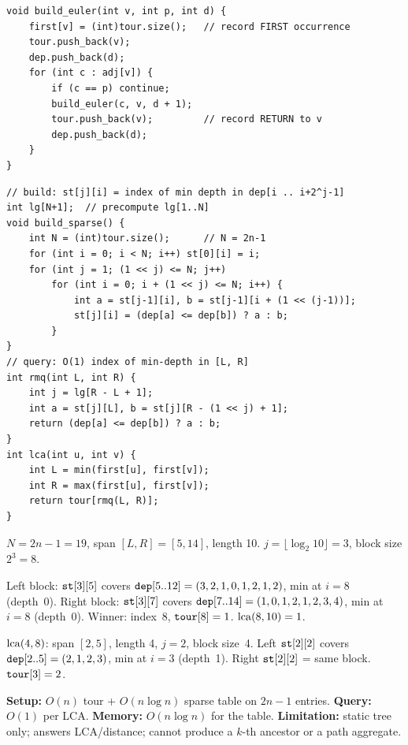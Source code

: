 \begin{lstlisting}[caption={Build tour, first[] and dep[] on a rooted tree (children ascending)}, label={lst:c11-euler}]
void build_euler(int v, int p, int d) {
    first[v] = (int)tour.size();   // record FIRST occurrence
    tour.push_back(v);
    dep.push_back(d);
    for (int c : adj[v]) {
        if (c == p) continue;
        build_euler(c, v, d + 1);
        tour.push_back(v);         // record RETURN to v
        dep.push_back(d);
    }
}
\end{lstlisting}

\begin{lstlisting}[caption={Build and query a sparse table on the tour depth array}, label={lst:c11-sparse}]
// build: st[j][i] = index of min depth in dep[i .. i+2^j-1]
int lg[N+1];  // precompute lg[1..N]
void build_sparse() {
    int N = (int)tour.size();      // N = 2n-1
    for (int i = 0; i < N; i++) st[0][i] = i;
    for (int j = 1; (1 << j) <= N; j++)
        for (int i = 0; i + (1 << j) <= N; i++) {
            int a = st[j-1][i], b = st[j-1][i + (1 << (j-1))];
            st[j][i] = (dep[a] <= dep[b]) ? a : b;
        }
}
// query: O(1) index of min-depth in [L, R]
int rmq(int L, int R) {
    int j = lg[R - L + 1];
    int a = st[j][L], b = st[j][R - (1 << j) + 1];
    return (dep[a] <= dep[b]) ? a : b;
}
int lca(int u, int v) {
    int L = min(first[u], first[v]);
    int R = max(first[u], first[v]);
    return tour[rmq(L, R)];
}
\end{lstlisting}

\begin{tracebox}
\(N = 2n-1 = 19\), span \([L,R] = [5,14]\), length 10.
\(j = \lfloor\log_2 10\rfloor = 3\), block size \(2^3 = 8\).

Left block: \(\texttt{st}[3][5]\) covers \(\texttt{dep}[5..12] = (3,2,1,0,1,2,1,2)\),
min at \(i=8\) (depth~0).  Right block: \(\texttt{st}[3][7]\) covers
\(\texttt{dep}[7..14] = (1,0,1,2,1,2,3,4)\), min at \(i=8\) (depth~0).
Winner: index~\(8\), \(\texttt{tour}[8] = 1\).  \(\operatorname{lca}(8,10)=1\).  \checkmark

\(\operatorname{lca}(4,8)\): span \([2,5]\), length 4, \(j=2\), block size~4.
Left \(\texttt{st}[2][2]\) covers \(\texttt{dep}[2..5]=(2,1,2,3)\), min at
\(i=3\) (depth~1).  Right \(\texttt{st}[2][2]\) = same block.  \(\texttt{tour}[3]=2\).  \checkmark
\end{tracebox}

\begin{complexitybox}
\textbf{Setup:} \(O(n)\) tour + \(O(n \log n)\) sparse table on
\(2n\!-\!1\) entries.  \textbf{Query:} \(O(1)\) per LCA.
\textbf{Memory:} \(O(n \log n)\) for the table.
\textbf{Limitation:} static tree only; answers LCA/distance; cannot
produce a \(k\)-th ancestor or a path aggregate.
\end{complexitybox}

